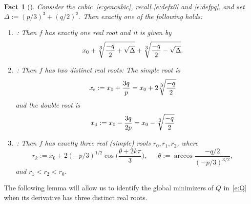 \documentclass[11pt]{article}
\newtheorem{fact}[theorem]{Fact}
\begin{document}
\begin{fact}[{\cite[Corollary 3.2]{arxiv1}}] \label{c:genroots} Consider the cubic~\cref{e:gencubic}, recall \cref{e:defx0} and \cref{e:defpq}, and
set  $\Delta := (p/3)^3+(q/2)^2$.
Then exactly one of the following holds:
\begin{enumerate}
\item 
\label{c:genroots1}
\,: 
Then $f$ has exactly one real root and it is given by
\begin{equation}
x_0+ \sqrt[\mathlarger 3]{\frac{-q}{2}+ \sqrt{\Delta}}
+
\sqrt[\mathlarger 3]{\frac{-q}{2}-\sqrt{\Delta}}. 
\end{equation}
\item 
\label{c:genroots2}
\,: 
Then $f$ has two distinct real roots: The simple root is
\begin{equation*}
x_\text{s}:=x_0+\frac{3q}{p} = x_0+2\sqrt[\mathlarger 3]{\frac{-q}{2}}
\end{equation*}
and the double root is
\begin{equation*}
x_\text{d}:=x_0-\frac{3q}{2p} = x_0 -\sqrt[\mathlarger 3]{\frac{-q}{2}}
\end{equation*}
\item 
\label{c:genroots3}
\,:
Then $f$ has exactly three real (simple) roots  $r_0,r_1,r_2$, where
\begin{equation}\label{e:theta}
r_k := x_0+2(-p/3)^{1/2}\cos\Big(\frac{\theta+2k\pi}{3} \Big), 
\quad\text{}\;\;
\theta := \arccos \frac{-q/2}{(-p/3)^{3/2}},
\end{equation}
and $r_1<r_2<r_0$. 
\end{enumerate}
\end{fact}

The following lemma will allow us to identify the global minimizers of $Q$ in~\cref{e:Q} when its derivative has three distinct real roots.
\end{document}
